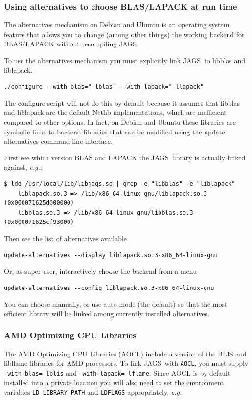 \documentclass[11pt, a4paper, titlepage]{article}
\newcommand{\JAGS}{\textsf{JAGS}}
\newcommand{\code}[1]{{\bgroup{\normalfont\ttfamily #1}\egroup}}
\begin{document}
\subsubsection{Using alternatives to choose BLAS/LAPACK at run time}

The alternatives mechanism on Debian and Ubuntu is an operating system
feature that allows you to change (among other things) the working backend
for BLAS/LAPACK without recompiling \JAGS.

To use the alternatives mechanism you must explicitly link \JAGS\ to
\code{libblas} and \code{liblapack}.
\begin{verbatim}
./configure --with-blas="-lblas" --with-lapack="-llapack"
\end{verbatim}
The configure script will not do this by default because it assumes
that \code{libblas} and \code{liblapack} are the default Netlib
implementations, which are inefficient compared to other options. In
fact, on Debian and Ubuntu these libraries are symbolic links to
backend libraries that can be modified using the
\code{update-alternatives} command line interface.

First see which version BLAS and LAPACK the \JAGS\ library is actually
linked against, {\em e.g.}:
\begin{verbatim}
$ ldd /usr/local/lib/libjags.so | grep -e "libblas" -e "liblapack"
	liblapack.so.3 => /lib/x86_64-linux-gnu/liblapack.so.3 (0x000071625d000000)
	libblas.so.3 => /lib/x86_64-linux-gnu/libblas.so.3 (0x000071625cf93000)
\end{verbatim}
Then see the list of alternatives available
\begin{verbatim}
update-alternatives --display liblapack.so.3-x86_64-linux-gnu
\end{verbatim}
Or, as super-user, interactively choose the backend from a menu
\begin{verbatim}
update-alternatives --config liblapack.so.3-x86_64-linux-gnu
\end{verbatim}
You can choose manually, or use auto mode (the default) so that the most efficient
library will be linked among currently installed alternatives.

\subsubsection{AMD Optimizing CPU Libraries}
\label{section:aocl:linux}

The AMD Optimizing CPU Libraries (AOCL) include a version of the BLIS
and libflame libraries for AMD processors. To link \JAGS\ with
\texttt{AOCL}, you must supply \texttt{--with-blas=-lblis} and
\texttt{--with-lapack=-lflame}.  Since AOCL is by default installed
into a private location you will also need to set the environment
variables \texttt{LD\_LIBRARY\_PATH} and \texttt{LDFLAGS}
appropriately, {\em e.g.}
\end{document}

